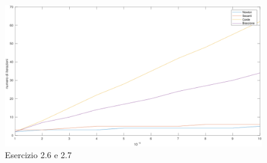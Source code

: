 \begin{flushleft}
\begin{figure}[h]
\caption{Esercizio 2.6 e 2.7}
\label{fes267}
\includegraphics[left, scale=0.6]{plot/fes267}
\end{figure}
\end{flushleft}



